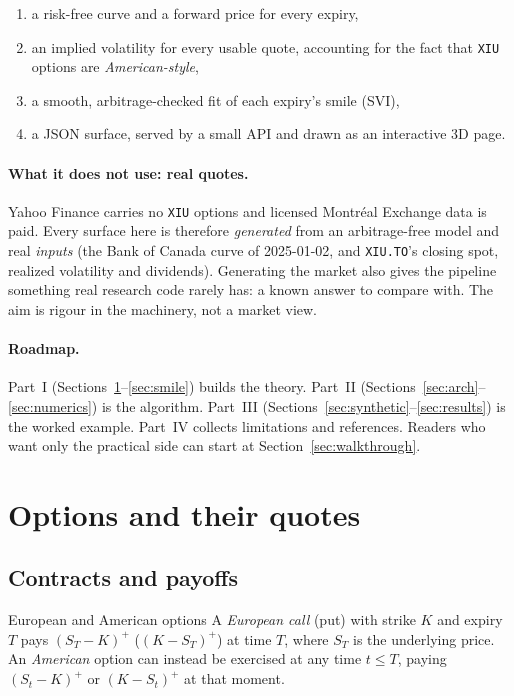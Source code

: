 \documentclass[11pt]{article}
\begin{document}
\begin{enumerate}
  \item a risk-free curve and a forward price for every expiry,
  \item an implied volatility for every usable quote, accounting for the fact
        that \texttt{XIU} options are \emph{American-style},
  \item a smooth, arbitrage-checked fit of each expiry's smile (SVI),
  \item a JSON surface, served by a small API and drawn as an interactive 3D page.
\end{enumerate}

\paragraph{What it does not use: real quotes.} Yahoo Finance carries no
\texttt{XIU} options and licensed Montr\'eal Exchange data is paid. Every surface
here is therefore \emph{generated} from an arbitrage-free model and real
\emph{inputs} (the Bank of Canada curve of 2025-01-02, and \texttt{XIU.TO}'s
closing spot, realized volatility and dividends). Generating the market also
gives the pipeline something real research code rarely has: a known answer to
compare with. The aim is rigour in the machinery, not a market view.

\paragraph{Roadmap.} Part~I (Sections~\ref{sec:options}--\ref{sec:smile}) builds
the theory. Part~II (Sections~\ref{sec:arch}--\ref{sec:numerics}) is the
algorithm. Part~III (Sections~\ref{sec:synthetic}--\ref{sec:results}) is the
worked example. Part~IV collects limitations and references. Readers who want
only the practical side can start at Section~\ref{sec:walkthrough}.

\section{Options and their quotes}\label{sec:options}

\subsection{Contracts and payoffs}

\begin{defn}{European and American options}
A \emph{European call} (put) with strike $K$ and expiry $T$ pays
$(S_T-K)^+$ ($(K-S_T)^+$) at time $T$, where $S_T$ is the underlying price. An
\emph{American} option can instead be exercised at any time $t\le T$, paying
$(S_t-K)^+$ or $(K-S_t)^+$ at that moment.
\end{defn}
\end{document}
